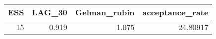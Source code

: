 \begin{longtable}{rrrr}
\toprule
ESS & LAG\_30 & Gelman\_rubin & acceptance\_rate \\ 
\midrule
15 & 0.919 & 1.075 & 24.80917 \\ 
\bottomrule
\end{longtable}

